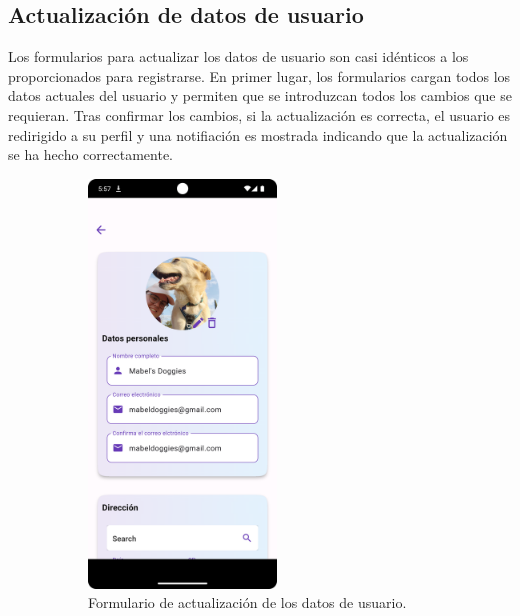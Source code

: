 \documentclass[a4paper, 12pt]{article}
\begin{document}
\newpage
\subsection*{Actualización de datos de usuario}

Los formularios para actualizar los datos de usuario son casi idénticos a los proporcionados para registrarse. En primer lugar, los formularios cargan todos los datos actuales del usuario y permiten que se introduzcan todos los cambios que se requieran. Tras confirmar los cambios, si la actualización es correcta, el usuario es redirigido a su perfil y una notifiación es mostrada indicando que la actualización se ha hecho correctamente.

\begin{figure}[H]
   	\begin{subfigure}{0.48\textwidth}
		\begin{center}
			{\includegraphics[width=5cm]{app/UserUpdate.png}\par}
			\caption{Formulario de actualización de los datos de usuario.}
		\end{center}  
	\end{subfigure}\hfill
   	\begin{subfigure}{0.48\textwidth}
		\begin{center}

\end{center}
\end{subfigure}
\end{figure}
\end{document}
